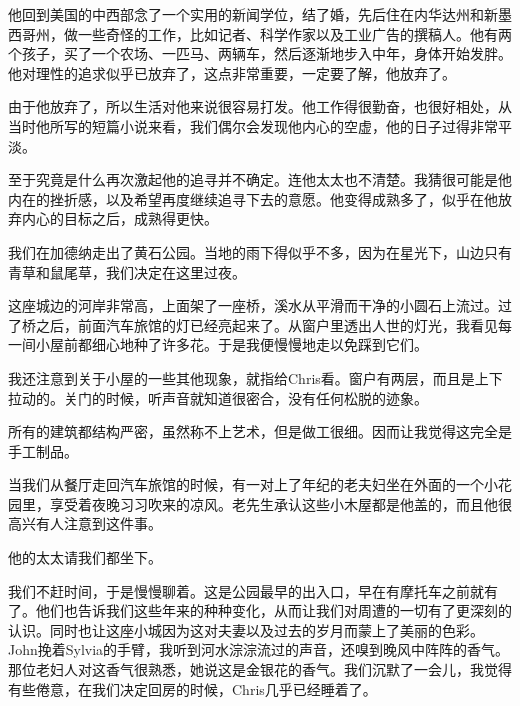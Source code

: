 \documentclass[UTF8]{article}
\begin{document}
\par 他回到美国的中西部念了一个实用的新闻学位，结了婚，先后住在内华达州和新墨西哥州，做一些奇怪的工作，比如记者、科学作家以及工业广告的撰稿人。他有两个孩子，买了一个农场、一匹马、两辆车，然后逐渐地步入中年，身体开始发胖。他对理性的追求似乎已放弃了，这点非常重要，一定要了解，他放弃了。
\par 由于他放弃了，所以生活对他来说很容易打发。他工作得很勤奋，也很好相处，从当时他所写的短篇小说来看，我们偶尔会发现他内心的空虚，他的日子过得非常平淡。
\par 至于究竟是什么再次激起他的追寻并不确定。连他太太也不清楚。我猜很可能是他内在的挫折感，以及希望再度继续追寻下去的意愿。他变得成熟多了，似乎在他放弃内心的目标之后，成熟得更快。
\par 我们在加德纳走出了黄石公园。当地的雨下得似乎不多，因为在星光下，山边只有青草和鼠尾草，我们决定在这里过夜。
\par 这座城边的河岸非常高，上面架了一座桥，溪水从平滑而干净的小圆石上流过。过了桥之后，前面汽车旅馆的灯已经亮起来了。从窗户里透出人世的灯光，我看见每一间小屋前都细心地种了许多花。于是我便慢慢地走以免踩到它们。
\par 我还注意到关于小屋的一些其他现象，就指给Chris看。窗户有两层，而且是上下拉动的。关门的时候，听声音就知道很密合，没有任何松脱的迹象。
\par 所有的建筑都结构严密，虽然称不上艺术，但是做工很细。因而让我觉得这完全是手工制品。
\par 当我们从餐厅走回汽车旅馆的时候，有一对上了年纪的老夫妇坐在外面的一个小花园里，享受着夜晚习习吹来的凉风。老先生承认这些小木屋都是他盖的，而且他很高兴有人注意到这件事。
\par 他的太太请我们都坐下。
\par 我们不赶时间，于是慢慢聊着。这是公园最早的出入口，早在有摩托车之前就有了。他们也告诉我们这些年来的种种变化，从而让我们对周遭的一切有了更深刻的认识。同时也让这座小城因为这对夫妻以及过去的岁月而蒙上了美丽的色彩。John挽着Sylvia的手臂，我听到河水淙淙流过的声音，还嗅到晚风中阵阵的香气。那位老妇人对这香气很熟悉，她说这是金银花的香气。我们沉默了一会儿，我觉得有些倦意，在我们决定回房的时候，Chris几乎已经睡着了。
\end{document}
